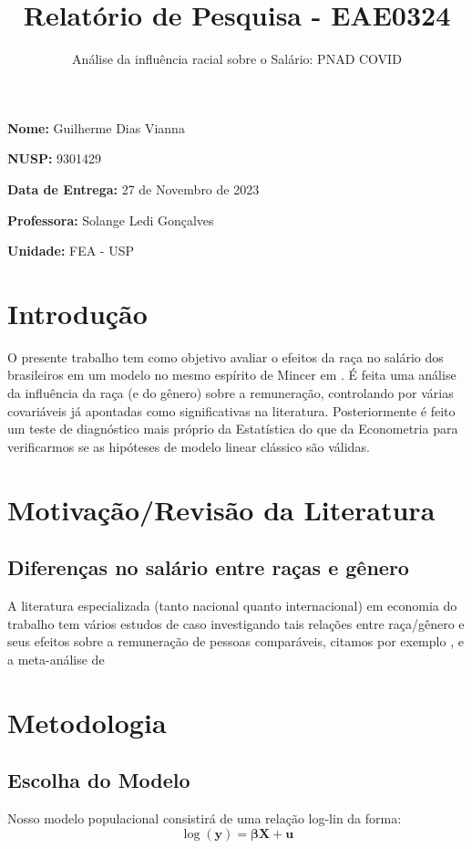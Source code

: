 \documentclass[paper=a4wide, fontsize=10pt]{scrartcl}	 %
\title{\vspace{-1.8cm}  \color{emerald} Relatório de Pesquisa - EAE0324}
\subtitle{Análise da influência racial sobre o Salário: PNAD COVID %
\vspace{-1.0cm} }
\date{} %
\begin{document}
\maketitle %
\thispagestyle{fancy} %


\vspace{-1.5cm} \textbf{Nome:} Guilherme Dias Vianna

\textbf{NUSP:} 9301429

\textbf{Data de Entrega:} 27 de Novembro de 2023

\textbf{Professora:} Solange Ledi Gonçalves

\textbf{Unidade:} FEA - USP

\section{Introdução}

    O presente trabalho tem como objetivo avaliar o efeitos da raça no salário dos brasileiros em um modelo no mesmo espírito de Mincer em \cite{doi:10.1086/258055}. É feita uma análise da influência da raça (e do gênero) sobre a remuneração, controlando por várias covariáveis já apontadas como significativas na literatura. Posteriormente é feito um teste de diagnóstico mais próprio da Estatística do que da Econometria para verificarmos se as hipóteses de modelo linear clássico são válidas.


\section{Motivação/Revisão da Literatura}
    \subsection{Diferenças no salário entre raças e gênero}
    A literatura especializada (tanto nacional quanto internacional) em economia do trabalho tem vários estudos de caso investigando tais relações entre raça/gênero e seus efeitos sobre a remuneração de pessoas comparáveis, citamos por exemplo \cite{Salardi2012WageDA}, \cite{madalozzo_2010}  e a meta-análise de \cite{https://doi.org/10.1111/j.0950-0804.2005.00256.x}

\section{Metodologia}
    \subsection{Escolha do Modelo}
    Nosso modelo populacional consistirá de uma relação log-lin da forma:
    \begin{equation}
        \log(\mathbf{y}) = \boldsymbol{\beta} \mathbf{X}+\mathbf{u}
    \end{equation}
\end{document}
